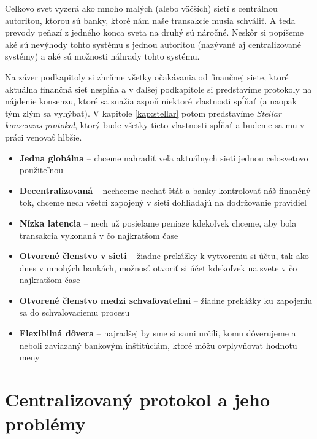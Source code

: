Celkovo svet vyzerá ako mnoho malých (alebo väčších) sietí s centrálnou autoritou,
ktorou sú banky, ktoré nám naše transakcie musia schváliť.
A teda prevody peňazí z jedného konca sveta na druhý sú náročné.
Neskôr si popíšeme aké sú nevýhody tohto systému s jednou autoritou (nazývané aj
centralizované systémy) a aké sú možnosti náhrady tohto systému.

Na záver podkapitoly si zhrňme všetky očakávania od finančnej siete, ktoré
aktuálna finančná sieť nespĺňa a v ďalšej podkapitole si predstavíme protokoly
na nájdenie konsenzu, ktoré sa snažia aspoň niektoré vlastnosti spĺňať (a naopak
tým zlým sa vyhýbať).
V kapitole \ref{kap:stellar} potom predstavíme \textit{Stellar konsenzus protokol},
ktorý bude všetky tieto vlastnosti spĺňať a budeme sa mu v práci venovať hlbšie.

\begin{itemize}
\item  \textbf{Jedna globálna} -- chceme nahradiť veľa aktuálnych sietí jednou
celosvetovo použiteľnou
\item  \textbf{Decentralizovaná} -- nechceme nechať štát a banky kontrolovať náš
finančný tok, chceme nech všetci zapojený v sieti dohliadajú na dodržovanie
pravidiel
\item  \textbf{Nízka latencia} -- nech už posielame peniaze kdekoľvek chceme, aby
bola transakcia vykonaná v čo najkratšom čase
\item  \textbf{Otvorené členstvo v sieti} -- žiadne prekážky k vytvoreniu si
účtu, tak ako dnes v mnohých bankách, možnosť otvoriť si účet kdekoľvek na svete
v čo najkratšom čase
\item  \textbf{Otvorené členstvo medzi schvaľovateľmi} -- žiadne prekážky ku
zapojeniu sa do schvaľovaciemu procesu
\item  \textbf{Flexibilná dôvera} -- najradšej by sme si sami určili, komu
dôverujeme a neboli zaviazaný bankovým inštitúciám, ktoré môžu ovplyvňovať
hodnotu meny
\end{itemize}

\pagebreak

\section {Centralizovaný protokol a jeho problémy}

